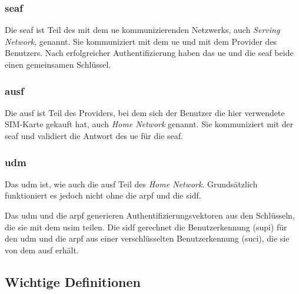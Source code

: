 \subsubsection{\gls{seaf}}

Die \gls{seaf} ist Teil des mit dem \gls{ue} kommunizierenden Netzwerks, auch \textit{Serving Network}, genannt.
Sie kommuniziert mit dem \gls{ue} und mit dem Provider des Benutzers.
Nach erfolgreicher Authentifizierung haben das \gls{ue} und die \gls{seaf} beide einen gemeinsamen Schl\"ussel.%

\subsubsection{\gls{ausf}}

Die \gls{ausf} ist Teil des Providers, bei dem sich der Benutzer die hier verwendete SIM-Karte gekauft hat, auch \textit{Home Network} genannt.
Sie kommuniziert mit der \gls{seaf} und validiert die Antwort des \gls{ue} f\"ur die \gls{seaf}.

\subsubsection{\gls{udm}}

Das \gls{udm} ist, wie auch die \gls{ausf} Teil des \textit{Home Network}.
Grunds\"atzlich funktioniert es jedoch nicht ohne die \gls{arpf} und die \gls{sidf}.

Das \gls{udm} und die \gls{arpf} generieren Authentifizierungsvektoren aus den Schl\"usseln, die sie mit dem \gls{usim} teilen.
Die \gls{sidf} gerechnet die Benutzerkennung (\gls{supi}) f\"ur den \gls{udm} und die \gls{arpf} aus einer verschl\"usselten Benutzerkennung (\gls{suci}), die sie von dem \gls{ausf} erh\"alt.


\subsection{Wichtige Definitionen}

